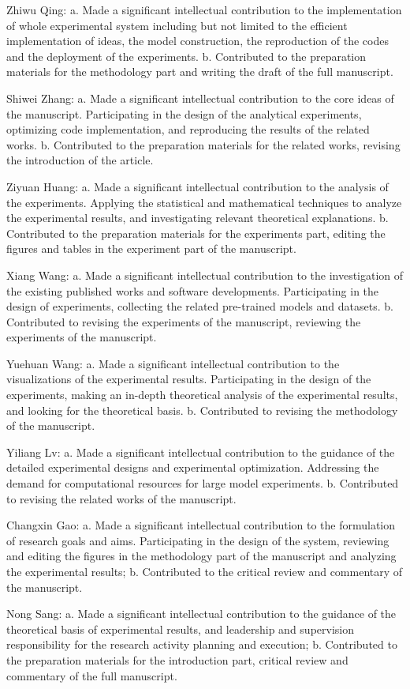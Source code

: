 Zhiwu Qing:
a. Made a significant intellectual contribution to the implementation of whole experimental system including but not limited to the efficient implementation of ideas, the model construction, the reproduction of the codes and the deployment of the experiments.
b. Contributed to the preparation materials for the methodology part and writing the draft of the full manuscript.



Shiwei Zhang:
a. Made a significant intellectual contribution to the core ideas of the manuscript. Participating in the design of the analytical experiments, optimizing code implementation, and reproducing the results of the related works.
b. Contributed to the preparation materials for the related works, revising the introduction of the article.



Ziyuan Huang:
a. Made a significant intellectual contribution to the analysis of the experiments. Applying the statistical and mathematical techniques to analyze the experimental results, and investigating relevant theoretical explanations.
b. Contributed to the preparation materials for the experiments part, editing the figures and tables in the experiment part of the manuscript.


Xiang Wang:
a. Made a significant intellectual contribution to the investigation of the existing published works and software developments. Participating in the design of experiments, collecting the related pre-trained models and datasets.
b. Contributed to revising the experiments of the manuscript, reviewing the experiments of the manuscript.


Yuehuan Wang:
a. Made a significant intellectual contribution to the visualizations of the experimental results. Participating in the design of the experiments, making an in-depth theoretical analysis of the experimental results, and looking for the theoretical basis.
b. Contributed to revising the methodology of the manuscript.


Yiliang Lv:
a. Made a significant intellectual contribution to the guidance of the detailed experimental designs and experimental optimization. Addressing the demand for computational resources for large model experiments.
b. Contributed to revising the related works of the manuscript. 



Changxin Gao:
a. Made a significant intellectual contribution to the formulation of research goals and aims. Participating in the design of the system, reviewing and editing the figures in the methodology part of the manuscript and analyzing the experimental results;
b. Contributed to the critical review and commentary of the manuscript.


Nong Sang:
a. Made a significant intellectual contribution to the guidance of the theoretical basis of experimental results, and leadership and supervision responsibility for the research activity planning and
execution;
b. Contributed to the preparation materials for the introduction part, critical review and commentary of the full manuscript.

